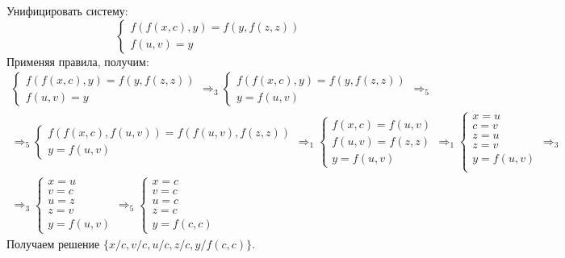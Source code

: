 \documentclass[11pt]{article}
\begin{document}
Унифицировать систему:
\begin{equation*}
\begin{cases}
f(f(x, c), y) = f(y, f(z, z)) \\
f(u, v) = y
\end{cases}
\end{equation*}
Применяя правила, получим:
\begin{multline*}
\begin{cases}
f(f(x, c), y) = f(y, f(z, z)) \\
f(u, v) = y
\end{cases}
\Rightarrow_3
\begin{cases}
f(f(x, c), y) = f(y, f(z, z)) \\
y = f(u, v)
\end{cases}
\Rightarrow_5 \\
\Rightarrow_5
\begin{cases}
f(f(x, c), f(u, v)) = f(f(u, v), f(z, z)) \\
y = f(u, v)
\end{cases}
\Rightarrow_1
\begin{cases}
f(x, c) = f(u, v) \\
f(u, v) = f(z, z) \\
y = f(u, v)
\end{cases}
\Rightarrow_1
\begin{cases}
x = u \\
c = v \\
z = u \\
z = v \\
y = f(u, v) \\
\end{cases}
\Rightarrow_3 \\
\Rightarrow_3
\begin{cases}
x = u \\
v = c \\
u = z \\
z = v \\
y = f(u, v)
\end{cases}
\Rightarrow_5
\begin{cases}
x = c \\
v = c \\
u = c \\
z = c \\
y = f(c, c)
\end{cases}
\end{multline*}
Получаем решение $\{x/c, v/c, u/c, z/c, y/f(c, c)\}$.
\end{document}

